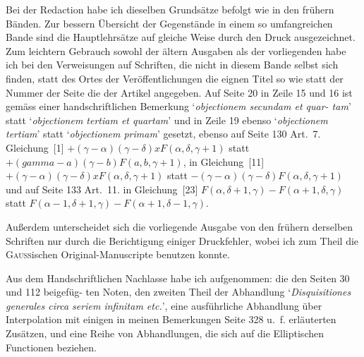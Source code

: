 \documentclass[12pt,a4paper]{article}
\begin{document}
Bei der Redaction habe ich dieselben Grunds\"atze befolgt wie in den fr\"uhern B\"anden. Zur bessern
\"Ubersicht der Gegenst\"ande in einem so umfangreichen Bande sind die Hauptlehrs\"atze auf gleiche Weise
durch den Druck ausgezeichnet. Zum leichtern Gebrauch sowohl der \"altern Ausgaben als der vorliegenden
habe ich bei den Verweisungen auf Schriften, die nicht in diesem Bande selbst sich finden, statt des Ortes der
Ver\"offentlichungen die eignen Titel so wie statt der Nummer der Seite die der Artikel angegeben. Auf
Seite 20 in Zeile 15 und 16 ist gem\"ass einer handschriftlichen Bemerkung `\textit{objectionem secundam et quar-\linebreak
\hspace*{\fill} tam}' statt `\textit{objectionem tertiam et quartam}' und in Zeile 19 ebenso `\textit{objectionem tertiam}' statt `\textit{objectionem\linebreak
\hspace*{\fill} primam}' gesetzt, ebenso auf Seite 130 Art.~7. Gleichung~[1] $+(\gamma-\alpha)(\gamma-\delta)xF(\alpha,\delta,\gamma+1)$ statt\linebreak
$+(gamma-a)(\gamma-b)F(a,b,\gamma+1)$, in Gleichung~[11] $+(\gamma-\alpha)(\gamma-\delta)xF(\alpha,\delta,\gamma+1)$ statt\linebreak
$-(\gamma-\alpha)(\gamma-\delta)F(\alpha,\delta,\gamma+1)$ und auf Seite 133 Art.~11. in Gleichung~[23]
$F(\alpha,\delta+1,\gamma) - F(\alpha+1,\delta,\gamma)$ statt $F(\alpha-1,\delta+1,\gamma) - F(\alpha+1,\delta-1,\gamma)$.

Au\ss erdem unterscheidet sich die vorliegende Ausgabe von den fr\"uhern derselben Schriften nur durch die Berichtigung einiger Druckfehler, wobei ich zum Theil die \textsc{Gau\ss}ischen Original-Manuscripte benutzen konnte.

Aus dem Handschriftlichen Nachlasse habe ich aufgenommen: die den Seiten 30 und 112 beigef\"ug-\linebreak
\hspace*{\fill} ten Noten, den zweiten Theil der Abhandlung `\textit{Disquisitiones generales circa seriem infinitam etc.}', eine\linebreak
\hspace*{\fill} ausf\"uhrliche Abhandlung \"uber Interpolation mit einigen in meinen Bemerkungen Seite 328 u.~f. erl\"auterten\linebreak
\hspace*{\fill} Zus\"atzen, und eine Reihe von Abhandlungen, die sich auf die Elliptischen Functionen beziehen.
\end{document}
